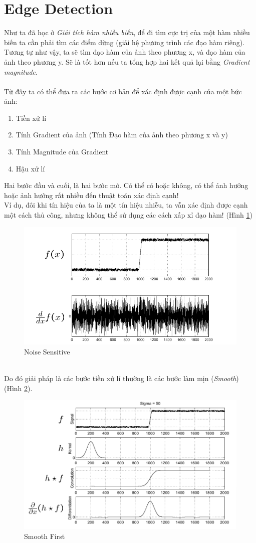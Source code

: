 \documentclass{article}
\begin{document}
\section{Edge Detection}
    Như ta đã học ở \textit{Giải tích hàm nhiều biến}, để đi tìm cực trị của một hàm nhiều biến ta cần phải tìm các điểm dừng (giải hệ phương trình các đạo hàm riêng). Tương tự như vậy, ta sẽ tìm đạo hàm của ảnh theo phương x, và đạo hàm của ảnh theo phương y. Sẽ là tốt hơn nếu ta tổng hợp hai kết quả lại bằng \textit{Gradient magnitude}.\\ \\
 Từ đây ta có thể đưa ra các bước cơ bản để xác định được cạnh của một bức ảnh:\begin{enumerate}
     \item Tiền xử lí
     \item Tính Gradient của ảnh (Tính Đạo hàm của ảnh theo phương x và y)
     \item Tính Magnitude của Gradient
     \item Hậu xử lí
 \end{enumerate} 
 Hai bước đầu và cuối, là hai bước mở. Có thể có hoặc không, có thể ảnh hưởng hoặc ảnh hưởng rất nhiều đến thuật toán xác định cạnh!\\
 Ví dụ, đôi khi tín hiệu của ta là một tín hiệu nhiễu, ta vẫn xác định được cạnh một cách thủ công, nhưng không thể sử dụng các cách xấp xỉ đạo hàm! (Hình \ref{fig3})
 \begin{figure}[ht!]
     \centering
     \includegraphics[width = 0.9\linewidth]{fig3.png}
     \caption{Noise Sensitive}
     \label{fig3}
 \end{figure}
 \phantom{a}\\
 Do đó giải pháp là các bước tiền xử lí thường là các bước làm mịn (\textit{Smooth}) (Hình \ref{fig4}). 
  \begin{figure}[ht!]
     \centering
     \includegraphics[width = 0.7\linewidth]{fig4.png}
     \caption{Smooth First}
     \label{fig4}
 \end{figure}
\end{document}
